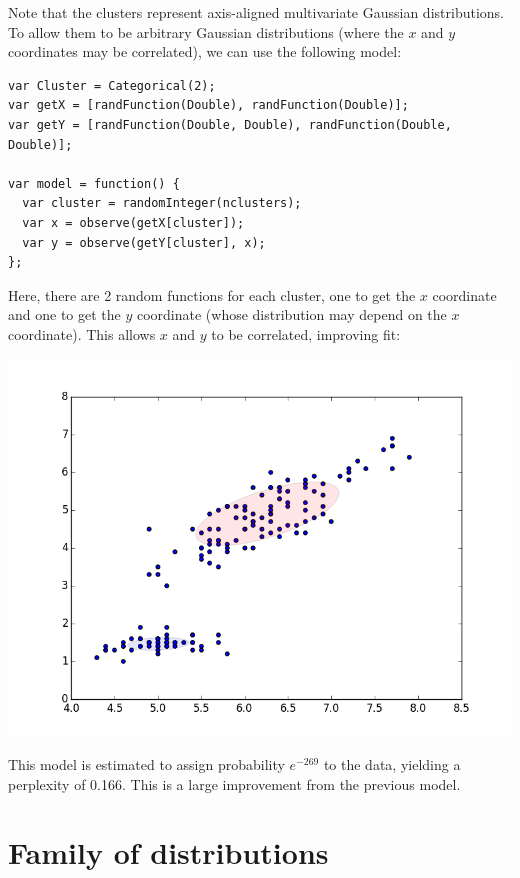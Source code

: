 \documentclass{article}
\begin{document}
  Note that the clusters represent axis-aligned multivariate Gaussian distributions.   To allow them to be arbitrary Gaussian distributions (where the $x$ and $y$ coordinates may be correlated),
  we can use the following model:

\begin{lstlisting}
var Cluster = Categorical(2);
var getX = [randFunction(Double), randFunction(Double)];
var getY = [randFunction(Double, Double), randFunction(Double, Double)];

var model = function() {
  var cluster = randomInteger(nclusters);
  var x = observe(getX[cluster]);
  var y = observe(getY[cluster], x);
};
\end{lstlisting}
  
  Here, there are 2 random functions for each cluster, one to get the $x$ coordinate and one to get the $y$ coordinate (whose distribution may depend on the $x$ coordinate).  This allows $x$ and $y$ to be correlated, improving fit:

  \begin{center}
    \includegraphics[scale=0.5]{../plots/irisclusters_dep.png}
  \end{center}

  This model is estimated to assign probability $e^{-269}$ to the data, yielding a perplexity of 0.166.  This is a large improvement from the previous model.


  \section{Family of distributions}
  
\end{document}
